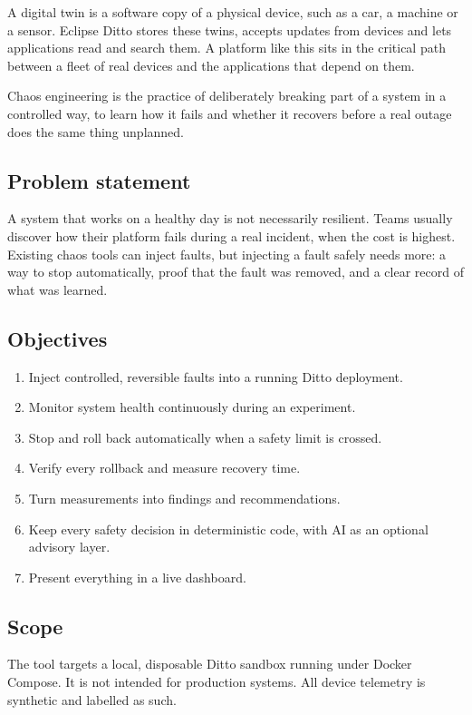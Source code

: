 \documentclass[11pt,a4paper]{article}
\begin{document}
A digital twin is a software copy of a physical device, such as a car, a
machine or a sensor. Eclipse Ditto stores these twins, accepts updates from
devices and lets applications read and search them. A platform like this sits
in the critical path between a fleet of real devices and the applications that
depend on them.

Chaos engineering is the practice of deliberately breaking part of a system in
a controlled way, to learn how it fails and whether it recovers before a real
outage does the same thing unplanned.

\subsection{Problem statement}

A system that works on a healthy day is not necessarily resilient. Teams
usually discover how their platform fails during a real incident, when the
cost is highest. Existing chaos tools can inject faults, but injecting a fault
safely needs more: a way to stop automatically, proof that the fault was
removed, and a clear record of what was learned.

\subsection{Objectives}

\begin{enumerate}
  \item Inject controlled, reversible faults into a running Ditto deployment.
  \item Monitor system health continuously during an experiment.
  \item Stop and roll back automatically when a safety limit is crossed.
  \item Verify every rollback and measure recovery time.
  \item Turn measurements into findings and recommendations.
  \item Keep every safety decision in deterministic code, with AI as an
        optional advisory layer.
  \item Present everything in a live dashboard.
\end{enumerate}

\subsection{Scope}

The tool targets a local, disposable Ditto sandbox running under Docker
Compose. It is not intended for production systems. All device telemetry is
synthetic and labelled as such.
\end{document}

